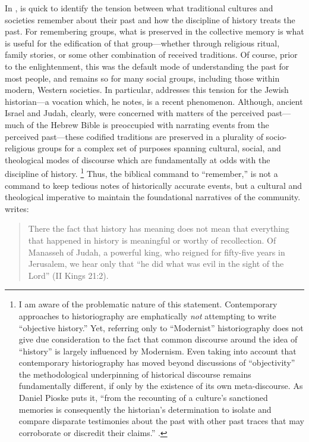 In , \yerushalmi is quick to identify the tension between what traditional cultures and societies remember about their past and how the discipline of history treats the past. For remembering groups, what is preserved in the collective memory is what is useful for the edification of that group---whether through religious ritual, family stories, or some other combination of received traditions. Of course, prior to the enlightenment, this was the default mode of understanding the past for most people, and remains so for many social groups, including those within modern, Western societies. In particular, \yerushalmi addresses this tension for the Jewish historian---a vocation which, he notes, is a recent phenomenon.\autocite[81--103]{yerushalmi1989} Although, ancient Israel and Judah, clearly, were concerned with matters of the perceived past---much of the Hebrew Bible is preoccupied with narrating events from the perceived past---these codified traditions are preserved in a plurality of socio-religious groups for a complex set of purposes spanning cultural, social, and theological modes of discourse which are fundamentally at odds with the discipline of history.%
%
\footnote{I am aware of the problematic nature of this statement. Contemporary approaches to historiography are emphatically \emph{not} attempting to write ``objective history.'' Yet, referring only to ``Modernist'' historiography does not give due consideration to the fact that common discourse around the idea of ``history'' is largely influenced by Modernism. Even taking into account that contemporary historiography has moved beyond discussions of ``objectivity'' the methodological underpinning of historical discourse remains fundamentally different, if only by the existence of its own meta-discourse. As Daniel Pioske puts it, ``from the recounting of a culture's sanctioned memories is consequently the historian's determination to isolate and compare disparate testimonies about the past with other past traces that may corroborate or discredit their claims.'' \cite[12--13]{pioske_bibint2015}.}
%
Thus, the biblical command to ``remember,'' is not a command to keep tedious notes of historically accurate events, but a cultural and theological imperative to maintain the foundational narratives of the community. \yerushalmi writes:  

\begin{quote} There the fact that history has meaning does not mean that everything that happened in history is meaningful or worthy of recollection. Of Manasseh of Judah, a powerful king, who reigned for fifty-five years in Jerusalem, we hear only that ``he did what was evil in the sight of the Lord'' (II Kings 21:2).\autocite[10]{yerushalmi1989} \end{quote}  

